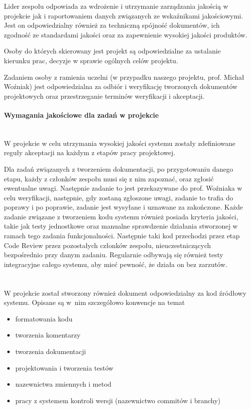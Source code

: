 \documentclass{article}
\begin{document}
Lider zespołu odpowiada za wdrożenie i utrzymanie zarządzania jakością w projekcie jak i raportowaniem danych związanych ze wskaźnikami jakościowymi. Jest on odpowiedzialny również za techniczną spójność dokumentów, ich zgodność ze standardami jakości oraz za zapewnienie wysokiej jakości produktów.

Osoby do których skierowany jest projekt są odpowiedzialne za ustalanie kierunku prac, decyzje w sprawie ogólnych celów projektu.

Zadaniem osoby z ramienia uczelni (w przypadku naszego projektu, prof. Michał Woźniak) jest odpowiedzialna za odbiór i weryfikację tworzonych dokumentów projektowych oraz przestrzeganie terminów weryfikacji i akceptacji.

\paragraph{Wymagania jakościowe dla zadań w projekcie}\mbox{}\\

W projekcie w celu utrzymania wysokiej jakości systemu zostały zdefiniowane reguły akceptacji na każdym z etapów pracy projektowej. 

Dla zadań związanych z tworzeniem dokumentacji, po przygotowaniu danego etapu, każdy z członków zespołu musi się z nim zapoznać, oraz zgłosić ewentualne uwagi. Następnie zadanie to jest przekazywane do prof. Woźniaka w celu weryfikacji, następnie, gdy zostaną zgłoszone uwagi, zadanie to trafia do poprawy i po poprawie, zadanie jest wysyłane i uznawane za zakończone. 
Każde zadanie związane z tworzeniem kodu systemu również posiada kryteria jakości, takie jak testy jednostkowe oraz manualne sprawdzenie działania stworzonej w ramach tego zadania funkcjonalności. Następnie taki kod przechodzi przez etap Code Review przez pozostałych członków zespołu, nieuczestniczących bezpośrednio przy danym zadaniu.
Regularnie odbywają się również testy integracyjne całego systemu, aby mieć pewność, że działa on bez zarzutów.
\mbox{}\\\mbox{}\\\mbox{}\\
W projekcie został stworzony również dokument odpowiedzialny za kod źródłowy systemu. Opisane są w~nim szczegółowo konwencje na temat
\begin{itemize}
\item formatowania kodu
\item tworzenia komentarzy
\item tworzenia dokumentacji
\item projektowania i tworzenia testów
\item nazewnictwa zmiennych i metod
\item pracy z systemem kontroli wersji (nazewnictwo commitów i branchy)
\end{itemize}
\end{document}
